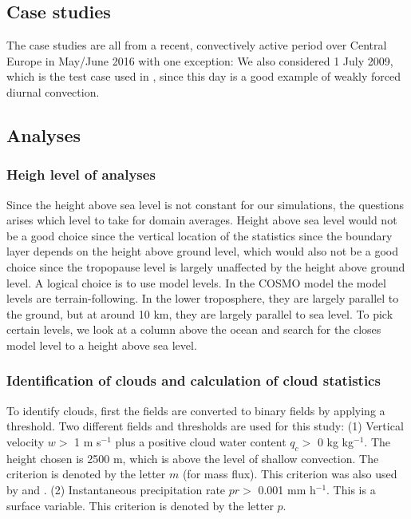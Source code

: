 \documentclass[a4paper, 12pt, draft]{article}
\begin{document}
\subsection{Case studies}
The case studies are all from a recent, convectively active period over Central Europe in May/June 2016 with one exception: We also considered 1 July 2009, which is the test case used in \cite{Kober2016}, since this day is a good example of weakly forced diurnal convection.  

\subsection{Analyses}

\subsubsection{Heigh level of analyses}
Since the height above sea level is not constant for our simulations, the questions arises which level to take for domain averages. Height above sea level would not be a good choice since the vertical location of the statistics since the boundary layer depends on the height above ground level, which would also not be a good choice since the tropopause level is largely unaffected by the height above ground level. A logical choice is to use model levels. In the COSMO model the model levels are terrain-following. In the lower troposphere, they are largely parallel to the ground, but at around 10 km, they are largely parallel to sea level. To pick certain levels, we look at a column above the ocean and search for the closes model level to a height above sea level. 

\subsubsection{Identification of clouds and calculation of cloud statistics}
To identify clouds, first the fields are converted to binary fields by applying a threshold. Two different fields and thresholds are used for this study: (1) Vertical velocity $w >$ 1 m s$^{-1}$ plus a positive cloud water content $q_c >$ 0 kg kg$^{-1}$. The height chosen is 2500 m, which is above the level of shallow convection. The criterion is denoted by the letter $m$ (for mass flux). This criterion was also used by \cite{Cohen2006} and \cite{Davoudi2010}. (2) Instantaneous precipitation rate $pr >$ 0.001 mm h$^{-1}$. This is a surface variable. This criterion is denoted by the letter $p$. 
\end{document}

